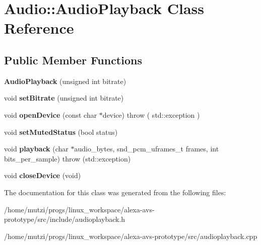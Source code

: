 \hypertarget{classAudio_1_1AudioPlayback}{}\section{Audio\+:\+:Audio\+Playback Class Reference}
\label{classAudio_1_1AudioPlayback}
\subsection*{Public Member Functions}
\begin{DoxyCompactItemize}
\item 
\mbox{\label{classAudio_1_1AudioPlayback_a4bb78d351c5b23644c83c22190976b0c}} 
{\bfseries Audio\+Playback} (unsigned int bitrate)
\item 
\mbox{\label{classAudio_1_1AudioPlayback_a9d875bae744862990d391874b68e83dd}} 
void {\bfseries set\+Bitrate} (unsigned int bitrate)
\item 
\mbox{\label{classAudio_1_1AudioPlayback_a9dc4ac63bc00886954e9ecb93f0698f1}} 
void {\bfseries open\+Device} (const char $\ast$device)  throw ( std\+::exception )
\item 
\mbox{\label{classAudio_1_1AudioPlayback_a2bff62e2eabfaf11338e87471f83454f}} 
void {\bfseries set\+Muted\+Status} (bool status)
\item 
\mbox{\label{classAudio_1_1AudioPlayback_a2e7ef66fa28be4998c7c0b52946d66bf}} 
void {\bfseries playback} (char $\ast$audio\+\_\+bytes, snd\+\_\+pcm\+\_\+uframes\+\_\+t frames, int bits\+\_\+per\+\_\+sample)  throw (std\+::exception)
\item 
\mbox{\label{classAudio_1_1AudioPlayback_a70208349648671399c23cc2b59ec6598}} 
void {\bfseries close\+Device} (void)
\end{DoxyCompactItemize}


The documentation for this class was generated from the following files\+:\begin{DoxyCompactItemize}
\item 
/home/mutzi/progs/linux\+\_\+workspace/alexa-\/avs-\/prototype/src/include/audioplayback.\+h\item 
/home/mutzi/progs/linux\+\_\+workspace/alexa-\/avs-\/prototype/src/audioplayback.\+cpp\end{DoxyCompactItemize}
